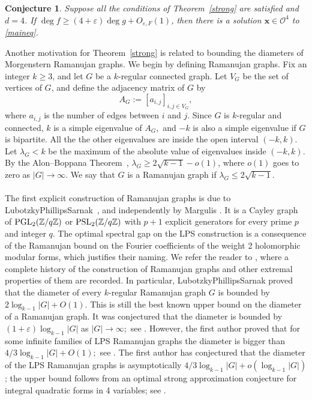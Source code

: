 \documentclass[10pt]{amsart}
\theoremstyle{plain}
\theoremstyle{plain}
\newtheorem{conjecture}[theorem]{Conjecture}
\renewcommand{\vec}[1]{\mathbf{#1}}
\theoremstyle{remark}
\theoremstyle{definition}
\newcommand{\PGL}{\textup{PGL}}
\newcommand{\PSL}{\textup{PSL}}
\begin{document}
\begin{conjecture}\label{conjectured4} 
Suppose all the conditions of Theorem~\ref{strong} are satisfied and $d=4$. If $\deg f \geq (4+\varepsilon)\deg g +O_{\varepsilon,F}(1)$, then  there is a solution $\vec{x} \in \mathcal{O}^4 $ to \eqref{maineq}. 
\end{conjecture}
 Another motivation for Theorem~\ref{strong} is related to bounding the diameters of Morgenstern Ramanujan graphs. We begin by defining Ramanujan graphs. Fix an integer $k\geq 3$, and let $G$ be a $k$-regular connected graph. Let $V_G$ be the set of vertices of $G$, and define the adjacency matrix of $G$  by
  \[
 A_G:=[a_{i,j}]_{ i,j\in V_G},
  \] where $a_{i,j}$ is the number of edges between $i$ and $j.$ Since $G$ is $k$-regular and connected, 
  $k$ is a simple eigenvalue of $A_G,$ and $-k$ is also a simple eigenvalue if $G$ is bipartite. All the the other eigenvalues are inside the open interval $(-k,k).$   Let $\lambda_G<k$ be the maximum of the absolute value of eigenvalues inside $(-k,k)$. By the Alon--Boppana Theorem~\cite{Lubotzky1988}, $\lambda_G\geq 2\sqrt{k-1}-o(1)$, where $o(1)$ goes to zero as $|G|\to \infty$.  We say that $G$ is a Ramanujan graph if  $\lambda_G \leq 2\sqrt{k-1}.$\\
\\
The first explicit construction of Ramanujan graphs is due to Lubotzky\textendash Phillips\textendash Sarnak~\cite{Lubotzky1988}, and independently by Margulis \cite{Margulis}. It is a Cayley graph of $\PGL_2(\mathbb{Z}/q\mathbb{Z})$ or $\PSL_2(\mathbb{Z}/q\mathbb{Z})$ with $p+1$ explicit generators for every prime $p$ and integer $q$.   The optimal spectral gap on the LPS construction is a consequence of the Ramanujan bound on the Fourier coefficients of the weight 2 holomorphic modular forms, which justifies their naming. 
We refer the reader to \cite[Chapter 3]{Peter}, where a complete history of the construction of Ramanujan graphs and other extremal properties of them are recorded. In particular, Lubotzky\textendash Phillips\textendash Sarnak proved that the diameter of every $k$-regular Ramanujan graph $G$ is bounded by $2\log_{k-1}|G|+O(1).$ This is still the best known upper bound on the diameter of a Ramanujan graph. It was conjectured that the diameter is bounded by $(1+\varepsilon)\log_{k-1}|G|$ as $|G|\to \infty;$ see \cite[Chapter 3]{Peter}. However, the first author proved that for some infinite families of LPS Ramanujan graphs the diameter is bigger than $4/3 \log_{k-1}|G|+O(1);$ see \cite{Sardari2018}. The first author has conjectured that the diameter of the LPS Ramanujan graphs is asymptotically $4/3\log_{k-1}|G|+o(\log_{k-1}|G|)$; the upper bound follows from an optimal strong approximation conjecture for integral quadratic forms in 4 variables; see \cite[Conjecture 1.3]{Naser2}. 
\\
\end{document}
